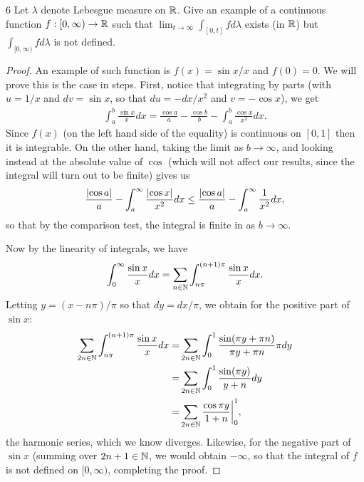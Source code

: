 \begin{exercise}{6}
Let $\lambda$ denote Lebesgue measure on $\mathbb{R}$.
Give an example of a continuous function $f: [0, \infty) \to \mathbb{R}$ such that $\lim_{t \to \infty} \int_{[0,t]} f d\lambda$ exists (in $\mathbb{R}$) but $\int_{[0, \infty)} f d\lambda$ is not defined.
\end{exercise}
\begin{proof}
An example of such function is $f(x) = \sin x/x$ and $f(0) = 0$.
We will prove this is the case in steps.
First, notice that integrating by parts (with $u = 1/x$ and $dv = \sin x$, so that $du = -dx/x^2$ and $v = -\cos x$), we get
\begin{align*}
    \int_a^b \frac{\sin x}{x} dx 
    = \frac{\cos a}{a} - \frac{\cos b}{b} - \int_a^b \frac{\cos x}{x^2} dx.
\end{align*}
Since $f(x)$ (on the left hand side of the equality) is continuous on $[0,1]$ then it is integrable.
On the other hand, taking the limit as $b \to \infty$, and looking instead at the absolute value of $\cos$ (which will not affect our results, since the integral will turn out to be finite) gives us 
\begin{align*}
    \frac{\left\lvert \cos a\right\rvert}{a} - \int_a^\infty \frac{\left\lvert \cos x\right\rvert}{x^2} dx
    \leq \frac{\left\lvert \cos a\right\rvert}{a} - \int_a^\infty \frac{1}{x^2} dx,
\end{align*}
so that by the comparison test, the integral is finite in as $b \to \infty$.

Now by the linearity of integrals, we have
\begin{align*}
    \int_0^\infty \frac{\sin x}{x} dx
    = \sum_{n \in \mathbb{N}} \int_{n\pi}^{(n+1)\pi} \frac{\sin x}{x} dx.
\end{align*}
Letting $y = (x - n\pi)/\pi$ so that $dy = dx/\pi$, we obtain for the positive part of $\sin x$:
\begin{align*}
    \sum_{2n \in \mathbb{N}} \int_{n\pi}^{(n+1)\pi} \frac{\sin x}{x} dx
    =& \sum_{2n \in \mathbb{N}} \int_0^1 \frac{\sin (\pi y + \pi n)}{\pi y + \pi n} \pi dy\\
    =& \sum_{2n \in \mathbb{N}} \int_0^1 \frac{\sin (\pi y)}{y + n} dy\\
    =& \sum_{2n \in \mathbb{N}} \frac{\cos \pi y}{1 + n}\bigg|_0^1,
\end{align*}
the harmonic series, which we know diverges.
Likewise, for the negative part of $\sin x$ (summing over $2n+1 \in \mathbb{N}$, we would obtain $-\infty$, so that the integral of $f$ is not defined on $[0,\infty)$, completing the proof.
\end{proof} 

